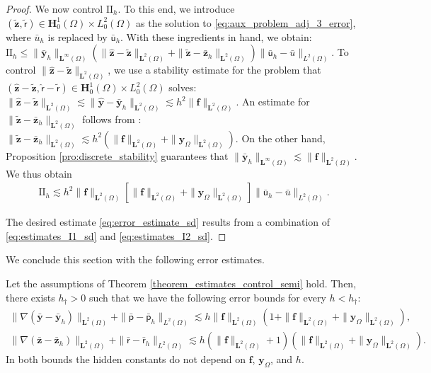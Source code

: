 \documentclass[final]{siamart0216}
\begin{document}
\begin{proof}
We now control $\text{II}_h$. To this end, we introduce $(\tilde{\mathbf{z}},\tilde{\mathsf{r}})\in \mathbf{H}_0^1(\Omega)\times L_0^2(\Omega)$ as the solution to \eqref{eq:aux_problem_adj_3_error}, where $\bar{u}_h$ is replaced by $\mathsf{\bar{u}}_h$. With these ingredients in hand, we obtain: $\text{II}_h \leq \|\bar{\mathbf{y}}_h\|_{\mathbf{L}^{\infty}(\Omega)}\left(\| \hat{\mathbf{z}}-\tilde{\mathbf{z}} \|_{\mathbf{L}^2(\Omega)}+\|\tilde{\mathbf{z}}-\bar{\mathbf{z}}_h\|_{\mathbf{L}^2(\Omega)}\right)\|\bar{\mathsf{u}}_h-\bar{u}\|_{L^2(\Omega)}.$ To control $\| \hat{\mathbf{z}}-\tilde{\mathbf{z}} \|_{\mathbf{L}^2(\Omega)}$, we use a stability estimate for the problem that $(\hat{\mathbf{z}}-\tilde{\mathbf{z}},\hat{\mathsf{r}}-\tilde{\mathsf{r}}) \in \mathbf{H}_0^1(\Omega)\times L_0^2(\Omega)$ solves: $\|\hat{\mathbf{z}}-\tilde{\mathbf{z}}\|_{\mathbf{L}^2(\Omega)}\lesssim \|\hat{\mathbf{y}}-\bar{\mathbf{y}}_h \|_{\mathbf{L}^2(\Omega)}\lesssim h^2 \|\mathbf{f}\|_{\mathbf{L}^2(\Omega)}$. An estimate for $\| \tilde{\mathbf{z}}-\bar{\mathbf{z}}_h \|_{\mathbf{L}^2(\Omega)}$ follows from \cite[Proposition 41.8]{Guermond-Ern}: $\| \tilde{\mathbf{z}}-\bar{\mathbf{z}}_h \|_{\mathbf{L}^2(\Omega)}\lesssim h^2(\|\mathbf{f}\|_{\mathbf{L}^2(\Omega)}+\|\mathbf{y}_{\Omega}\|_{\mathbf{L}^2(\Omega)})$. On the other hand, Proposition \ref{pro:discrete_stability} guarantees that
$\| \bar{\mathbf{y}}_h\|_{\mathbf{L}^{\infty}(\Omega)} \lesssim \| \mathbf{f} \|_{\mathbf{L}^{2}(\Omega)}$. We thus obtain
\begin{align}\label{eq:estimates_I2_sd}
\text{II}_h \lesssim h^2 \| \mathbf{f} \|_{\mathbf{L}^{2}(\Omega)} [\|\mathbf{f}\|_{\mathbf{L}^2(\Omega)}+\|\mathbf{y}_{\Omega}\|_{\mathbf{L}^2(\Omega)}]\|\bar{\mathsf{u}}_h-\bar{u}\|_{L^2(\Omega)}.
\end{align}

The desired estimate \eqref{eq:error_estimate_sd} results from a combination of \eqref{eq:estimates_I1_sd} and \eqref{eq:estimates_I2_sd}. 
\end{proof}

We conclude this section with the following error estimates.
\begin{corollary}
Let the assumptions of Theorem \ref{theorem_estimates_control_semi} hold. Then, there exists $h_{\dagger}>0$ such that we have the following error bounds for every  $h<h_{\dagger}$:
\begin{align*}\label{eq:estimates_error_semi_allvariables}
\|\nabla(\bar{\mathbf{y}}-\bar{\mathbf{y}}_{h})\|_{\mathbf{L}^2(\Omega)}
+
\|\bar{\mathsf{p}}-\bar{\mathsf{p}}_{h}\|_{L^2(\Omega)}\lesssim h\|\mathbf{f}\|_{\mathbf{L}^2(\Omega)}(1+\|\mathbf{f}\|_{\mathbf{L}^2(\Omega)}+\|\mathbf{y}_{\Omega}\|_{\mathbf{L}^2(\Omega)}),
\\
\|\nabla(\bar{\mathbf{z}}-\bar{\mathbf{z}}_{h})\|_{\mathbf{L}^2(\Omega)}+\|\bar{\mathsf{r}}-\bar{\mathsf{r}}_{h}\|_{L^2(\Omega)}
\lesssim
h( \|\mathbf{f}\|_{\mathbf{L}^2(\Omega)} + 1 )(\|\mathbf{f}\|_{\mathbf{L}^2(\Omega)}+\|\mathbf{y}_{\Omega}\|_{\mathbf{L}^2(\Omega)}).
\end{align*}
In both bounds the hidden constants do not depend on $\mathbf{f}$, $\mathbf{y}_{\Omega}$, and $h$.
\end{corollary}
\end{document}
